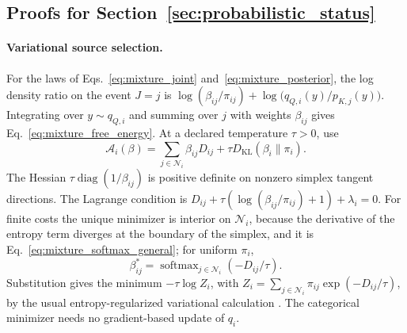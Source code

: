 \documentclass[twoside,11pt]{article}
\begin{document}
\subsection{Proofs for Section~\ref{sec:probabilistic_status}}
\label{app:proofs_probabilistic}

\paragraph{Variational source selection.}
For the laws of Eqs.~\eqref{eq:mixture_joint} and~\eqref{eq:mixture_posterior}, the log density ratio on the event $J=j$ is $\log(\beta_{ij}/\pi_{ij})+\log\bigl(q_{Q,i}(y)/p_{K,j}(y)\bigr)$. Integrating over $y\sim q_{Q,i}$ and summing over $j$ with weights $\beta_{ij}$ gives Eq.~\eqref{eq:mixture_free_energy}. At a declared temperature $\tau>0$, use
\begin{equation}
\mathcal A_i(\beta)=\sum_{j\in\mathcal N_i}\beta_{ij}D_{ij}
+\tau D_{\mathrm{KL}}(\beta_i\|\pi_i).
\label{eq:F_align_canonical_tau}
\end{equation}
The Hessian $\tau\operatorname{diag}(1/\beta_{ij})$ is positive definite on nonzero simplex tangent directions. The Lagrange condition is
$D_{ij}+\tau(\log(\beta_{ij}/\pi_{ij})+1)+\lambda_i=0$.
For finite costs the unique minimizer is interior on $\mathcal N_i$, because the derivative of the entropy term diverges at the boundary of the simplex, and it is Eq.~\eqref{eq:mixture_softmax_general}; for uniform $\pi_i$,
\begin{equation}
\beta_{ij}^*=\operatorname{softmax}_{j\in\mathcal N_i}(-D_{ij}/\tau).
\label{eq:mixture_softmax}
\end{equation}
Substitution gives the minimum $-\tau\log Z_i$, with
$Z_i=\sum_{j\in\mathcal N_i}\pi_{ij}\exp(-D_{ij}/\tau)$, by the usual entropy-regularized variational calculation \citep{Boyd2004,Wainwright2008,Niculae2017Regularized}. The categorical minimizer needs no gradient-based update of $q_i$.
\end{document}
